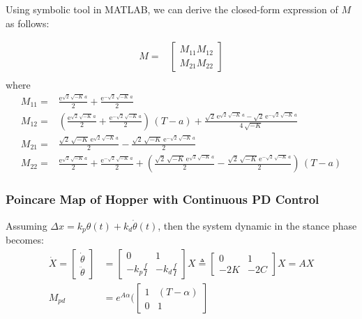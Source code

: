 \noindent Using symbolic tool in MATLAB, we can derive the closed-form expression of $M$ as follows:

\begin{align*}
M =& \begin{bmatrix}
M_{11} M_{12}  \\
M_{21} M_{22}
\end{bmatrix}\\
\end{align*}
where
\begin{align*}
M_{11} =&\frac{{\mathrm{e}}^{\sqrt{2}\,\sqrt{-K}\,a}}{2}+\frac{{\mathrm{e}}^{-\sqrt{2}\,\sqrt{-K}\,a}}{2}\\
M_{12} =&\left(\frac{{\mathrm{e}}^{\sqrt{2}\,\sqrt{-K}\,a}}{2}+\frac{{\mathrm{e}}^{-\sqrt{2}\,\sqrt{-K}\,a}}{2}\right)\,\left(T-a\right)+\frac{\sqrt{2}\,{\mathrm{e}}^{\sqrt{2}\,\sqrt{-K}\,a}-\sqrt{2}\,{\mathrm{e}}^{-\sqrt{2}\,\sqrt{-K}\,a}}{4\,\sqrt{-K}}\\
M_{21} =&\frac{\sqrt{2}\,\sqrt{-K}\,{\mathrm{e}}^{\sqrt{2}\,\sqrt{-K}\,a}}{2}-\frac{\sqrt{2}\,\sqrt{-K}\,{\mathrm{e}}^{-\sqrt{2}\,\sqrt{-K}\,a}}{2}\\
M_{22} =&\frac{{\mathrm{e}}^{\sqrt{2}\,\sqrt{-K}\,a}}{2}+\frac{{\mathrm{e}}^{-\sqrt{2}\,\sqrt{-K}\,a}}{2}+\left(\frac{\sqrt{2}\,\sqrt{-K}\,{\mathrm{e}}^{\sqrt{2}\,\sqrt{-K}\,a}}{2}-\frac{\sqrt{2}\,\sqrt{-K}\,{\mathrm{e}}^{-\sqrt{2}\,\sqrt{-K}\,a}}{2}\right)\,\left(T-a\right)
\end{align*}


\subsubsection{Poincare Map of Hopper with Continuous PD Control}

Assuming $\Delta x = k_p\theta(t) + k_d\dot\theta(t)$, then the system dynamic in the stance phase becomes:
\begin{align}
\label{eq:EOM_flight3}
\dot X = 
\begin{bmatrix}
\dot \theta  \\
\ddot \theta
\end{bmatrix} &= \begin{bmatrix}
0 & 1 \\
-k_p\frac{f}{I} & -k_d\frac{f}{I}
\end{bmatrix}X \triangleq \begin{bmatrix}
0 & 1 \\
-2K & -2C
\end{bmatrix}X = AX\\
M_{pd} &=   e^{A\alpha}(\begin{bmatrix}
        1 & (T-\alpha) \\
        0 & 1
        \end{bmatrix}
\end{align}


